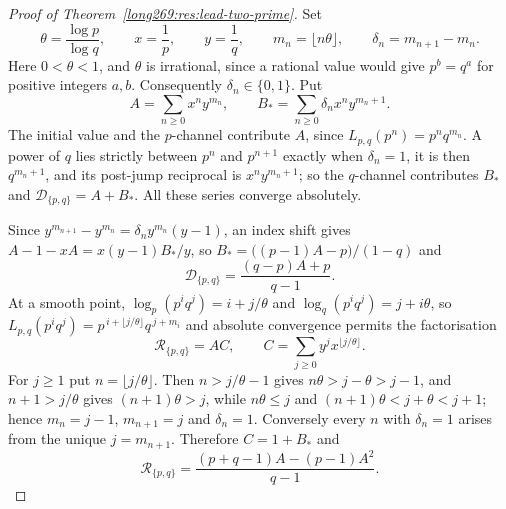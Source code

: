 \begin{proof}[Proof of Theorem~\ref{long269:res:lead-two-prime}]
Set
\[
 \theta=\frac{\log p}{\log q},\qquad x=\frac1p,\qquad y=\frac1q,\qquad
 m_n=\lfloor n\theta\rfloor,\qquad \delta_n=m_{n+1}-m_n .
\]
Here $0<\theta<1$, and $\theta$ is irrational, since a rational value would
give $p^{b}=q^{a}$ for positive integers $a,b$.  Consequently
$\delta_n\in\{0,1\}$.  Put
\[
 A=\sum_{n\ge0}x^ny^{m_n},
 \qquad
 B_\ast=\sum_{n\ge0}\delta_nx^ny^{m_n+1} .
\]
The initial value and the $p$-channel contribute $A$, since
$L_{p,q}(p^n)=p^nq^{m_n}$.  A power of $q$ lies strictly between $p^n$ and
$p^{n+1}$ exactly when $\delta_n=1$, it is then $q^{m_n+1}$, and its post-jump
reciprocal is $x^ny^{m_n+1}$; so the $q$-channel contributes $B_\ast$ and
$\mathcal D_{\{p,q\}}=A+B_\ast$.  All these series converge absolutely.

Since $y^{m_{n+1}}-y^{m_n}=\delta_ny^{m_n}(y-1)$, an index shift gives
$A-1-xA=x(y-1)B_\ast/y$, so $B_\ast=\bigl((p-1)A-p\bigr)/(1-q)$ and
\begin{equation}\label{long269:eq:two-prime-affine}
 \mathcal D_{\{p,q\}}=\frac{(q-p)A+p}{q-1} .
\end{equation}
At a smooth point, $\log_p(p^iq^j)=i+j/\theta$ and
$\log_q(p^iq^j)=j+i\theta$, so
$L_{p,q}(p^iq^j)=p^{\,i+\lfloor j/\theta\rfloor}q^{\,j+m_i}$ and absolute
convergence permits the factorisation
\[
 \mathcal R_{\{p,q\}}=AC,\qquad C=\sum_{j\ge0}y^jx^{\lfloor j/\theta\rfloor}.
\]
For $j\ge1$ put $n=\lfloor j/\theta\rfloor$.  Then $n>j/\theta-1$ gives
$n\theta>j-\theta>j-1$, and $n+1>j/\theta$ gives $(n+1)\theta>j$, while
$n\theta\le j$ and $(n+1)\theta<j+\theta<j+1$; hence $m_n=j-1$, $m_{n+1}=j$ and
$\delta_n=1$.  Conversely every $n$ with $\delta_n=1$ arises from the unique
$j=m_{n+1}$.  Therefore $C=1+B_\ast$ and
\begin{equation}\label{long269:eq:two-prime-quadratic}
 \mathcal R_{\{p,q\}}
 =\frac{(p+q-1)A-(p-1)A^{2}}{q-1} .
\end{equation}


\end{proof}
